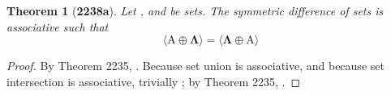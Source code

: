 \documentclass[preview]{standalone}
\newtheorem*{theorem*}{Theorem}
\begin{document}
\begin{theorem*}[\textbf{2238a}] \color{black}
    Let , and \bm{$\Lambda$} be sets. 
    The symmetric difference of sets is associative such that 
    \begin{equation*}
        \bm{
            \big \langle \mathrm{A} \oplus \Lambda \big \rangle
                = 
            \big \langle \Lambda \oplus \mathrm{A} \big \rangle
        }
    \end{equation*}
\end{theorem*}
\begin{proof} \color{black}
    By Theorem 2235, 
    . 
    Because set union is associative, and because set intersection is associative,
    trivially 
    ;
    by Theorem 2235, 
    .
\color{lightgray} \end{proof}
\end{document}

